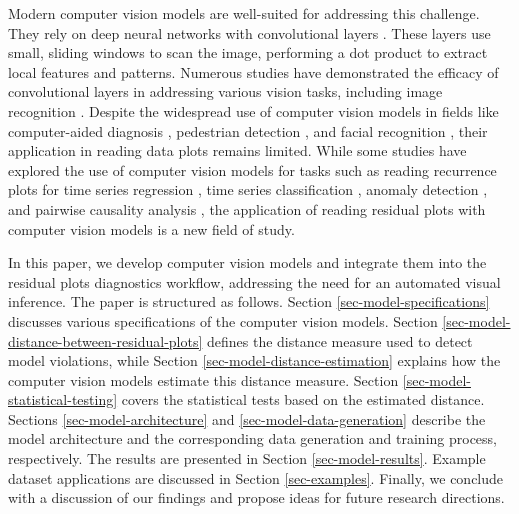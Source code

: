\documentclass[]{interact}
\theoremstyle{plain}%
\theoremstyle{definition}
\theoremstyle{remark}
\begin{document}
Modern computer vision models are well-suited for addressing this
challenge. They rely on deep neural networks with convolutional layers
\citep{fukushima1982neocognitron}. These layers use small, sliding
windows to scan the image, performing a dot product to extract local
features and patterns. Numerous studies have demonstrated the efficacy
of convolutional layers in addressing various vision tasks, including
image recognition \citep{rawat2017deep}. Despite the widespread use of
computer vision models in fields like computer-aided diagnosis
\citep{lee2015image}, pedestrian detection \citep{brunetti2018computer},
and facial recognition \citep{emami2012facial}, their application in
reading data plots remains limited. While some studies have explored the
use of computer vision models for tasks such as reading recurrence plots
for time series regression \citep{ojeda2020multivariate}, time series
classification
\citep{chu2019automatic, hailesilassie2019financial, hatami2018classification, zhang2020encoding},
anomaly detection \citep{chen2020convolutional}, and pairwise causality
analysis \citep{singh2017deep}, the application of reading residual
plots with computer vision models is a new field of study.

In this paper, we develop computer vision models and integrate them into
the residual plots diagnostics workflow, addressing the need for an
automated visual inference. The paper is structured as follows. Section
\ref{sec-model-specifications} discusses various specifications of the
computer vision models. Section
\ref{sec-model-distance-between-residual-plots} defines the distance
measure used to detect model violations, while Section
\ref{sec-model-distance-estimation} explains how the computer vision
models estimate this distance measure. Section
\ref{sec-model-statistical-testing} covers the statistical tests based
on the estimated distance. Sections \ref{sec-model-architecture} and
\ref{sec-model-data-generation} describe the model architecture and the
corresponding data generation and training process, respectively. The
results are presented in Section \ref{sec-model-results}. Example
dataset applications are discussed in Section \ref{sec-examples}.
Finally, we conclude with a discussion of our findings and propose ideas
for future research directions.
\end{document}
